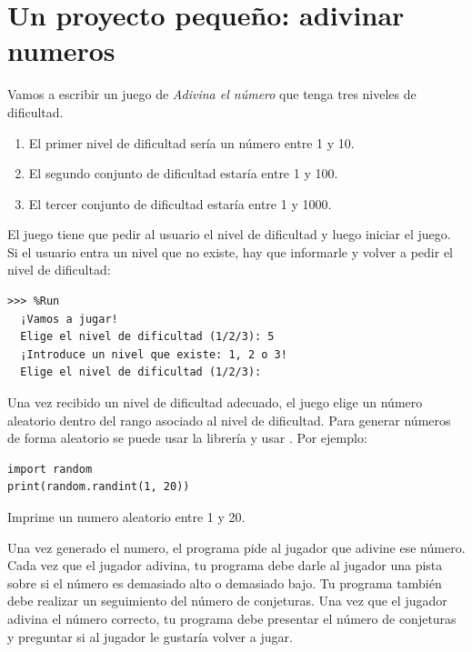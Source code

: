 \section{Un proyecto pequeño: adivinar numeros}

Vamos a escribir un juego de {\em Adivina el número} que tenga tres niveles de dificultad. 

\begin{enumerate}
\item El primer nivel de dificultad sería un número entre 1 y 10. 
\item El segundo conjunto de dificultad estaría entre 1 y 100. 
\item El tercer conjunto de dificultad estaría entre 1 y 1000.
\end{enumerate}

El juego tiene que pedir al usuario el nivel de dificultad y luego iniciar el juego. Si el usuario entra un nivel que no existe, hay que informarle y volver a pedir el nivel de dificultad:\\

\begin{Verbatim}[frame=single, label={\em example test execution of the program}]
>>> %Run 
  ¡Vamos a jugar!
  Elige el nivel de dificultad (1/2/3): 5
  ¡Introduce un nivel que existe: 1, 2 o 3!
  Elige el nivel de dificultad (1/2/3): 
\end{Verbatim}
    
Una vez recibido un nivel de dificultad adecuado, el juego elige un número aleatorio dentro del rango asociado al nivel de dificultad. Para generar números de forma aleatorio se puede usar la librería  y usar . Por ejemplo:

\begin{verbatim}
import random
print(random.randint(1, 20))
\end{verbatim}

Imprime un numero aleatorio entre 1 y 20.

Una vez generado el numero, el programa pide al jugador que adivine ese número. Cada vez que el jugador adivina, tu programa debe darle al jugador una pista sobre si el número es demasiado alto o demasiado bajo. Tu programa también debe realizar un seguimiento del número de conjeturas. Una vez que el jugador adivina el número correcto, tu programa debe presentar el número de conjeturas y preguntar si al jugador le gustaría volver a jugar.\\

